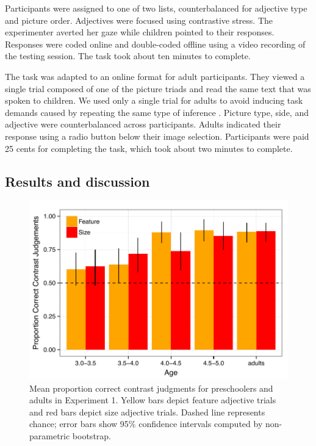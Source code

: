 \documentclass[man]{apa2}
\begin{document}
Participants were assigned to one of two lists, counterbalanced for adjective type and picture order.  Adjectives were focused using contrastive stress. The experimenter averted her gaze while children pointed to their responses.  Responses were coded online and double-coded offline using a video recording of the testing session.  The task took about ten minutes to complete. 

The task was adapted to an online format for adult participants. They viewed a single trial composed of one of the picture triads and read the same text that was spoken to children. We used only a single trial for adults to avoid inducing task demands caused by repeating the same type of inference \cite{frank2012}. Picture type, side, and adjective were counterbalanced across participants.  Adults indicated their response using a radio button below their image selection.  Participants were paid 25 cents for completing the task, which took about two minutes to complete. 

\subsection{Results and discussion}

\begin{figure}[t] 
  \begin{center} 
    \includegraphics[width=5in]{figures/expt1_mod.pdf} 
    \caption{\label{fig:expt1_kidsAdults} Mean proportion correct contrast judgments for preschoolers and adults in Experiment 1. Yellow bars depict feature adjective trials and red bars depict size adjective trials. Dashed line represents chance; error bars show 95\% confidence intervals computed by non-parametric bootstrap.}
  \end{center} 
\end{figure}	
\end{document}
